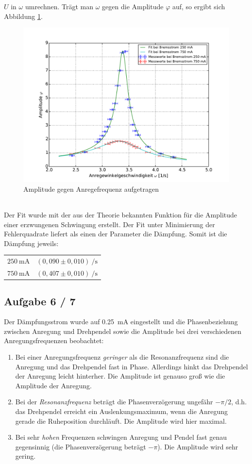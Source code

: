 $ U $ in $ \omega $ umrechnen. Trägt man $ \omega $ gegen die Amplitude $ \varphi $ auf, so ergibt sich Abbildung \ref{fig:Erzwungen}.
\begin{figure}[h]
	\centering
	\includegraphics[width=\linewidth]{diagramme/5).pdf}
	\caption[Amplitudenfunktion]{Amplitude gegen Anregefrequenz aufgetragen}
	\label{fig:Erzwungen}
\end{figure}\\
Der Fit wurde mit der aus der Theorie bekannten Funktion für die Amplitude einer erzwungenen Schwingung erstellt. Der Fit unter Minimierung der Fehlerquadrate liefert als einen der Parameter die Dämpfung. Somit ist die Dämpfung jeweils:\\
\begin{tabular}{r@{: }l}
$ \SI{250}{\milli\ampere} $ & $ (0{,}090 \pm 0{,}010)~\si{\per\second} $ \\
$ \SI{750}{\milli\ampere} $ & $ (0{,}407 \pm 0{,}010)~\si{\per\second} $
\end{tabular}
\subsection{Aufgabe 6 / 7}
Der Dämpfungsstrom wurde auf \SI{0.25}{mA} eingestellt und die Phasenbeziehung zwischen Anregung und Drehpendel sowie die Amplitude bei drei verschiedenen Anregungsfrequenzen beobachtet:
\begin{enumerate}
  \item Bei einer Anregungsfrequenz \textit{geringer} als die Resonanzfrequenz sind die Anregung und das Drehpendel fast in Phase. Allerdings hinkt das Drehpendel der Anregung leicht hinterher.
Die Amplitude ist genauso groß wie die Amplitude der Anregung.
  \item Bei der \textit{Resonanzfrequenz} beträgt die Phasenverzögerung ungefähr $-\pi/2$, d.h. das Drehpendel erreicht ein Auslenkungsmaximum, wenn die Anregung gerade die Ruheposition durchläuft.
    Die Amplitude wird hier maximal.
  \item Bei sehr \textit{hohen} Frequenzen schwingen Anregung und Pendel fast genau gegensinnig (die Phasenverzögerung beträgt $-\pi$). 
    Die Amplitude wird sehr gering.
\end{enumerate}

